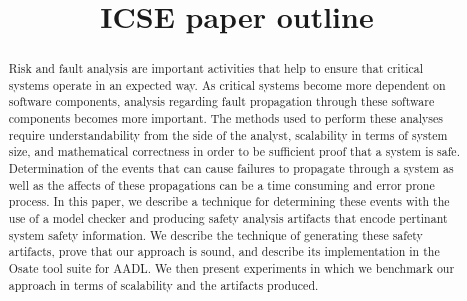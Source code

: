 \documentclass[10pt,conference]{IEEEtran}
\begin{document}
\newcommand{\stateequiv}{\equiv_{s}}
\newcommand{\traceequiv}{\equiv_{\sigma}}
\newcommand{\ta}{\text{TA}}
\newcommand{\cta}{\text{TA$_{C}$}}
\newcommand{\tta}{\text{TA$_{T}$}}
\newcommand{\ucalg}{\texttt{\small{IVC\_UC}}}
\newcommand{\ucbfalg}{\texttt{\small{IVC\_UCBF}}}
\newcommand\doesnotentail{\mkern-2mu\not\mkern2mu\vdash}


\title{ICSE paper outline}
%


\author{
}


\maketitle

\begin{abstract}
Risk and fault analysis are important activities that help to ensure that critical systems operate in an expected way. As critical systems become more dependent on software components, analysis regarding fault propagation through these software components becomes more important. The methods used to perform these analyses require understandability from the side of the analyst, scalability in terms of system size, and mathematical correctness in order to be sufficient proof that a system is safe. Determination of the events that can cause failures to propagate through a system as well as the affects of these propagations can be a time consuming and error prone process. In this paper, we describe a technique for determining these events with the use of a model checker and producing safety analysis artifacts that encode pertinant system safety information. We describe the technique of generating these safety artifacts, prove that our approach is sound, and describe its implementation in the Osate tool suite for AADL. We then present experiments in which we benchmark our approach in terms of scalability and the artifacts produced. 
\end{abstract}
\end{document}
